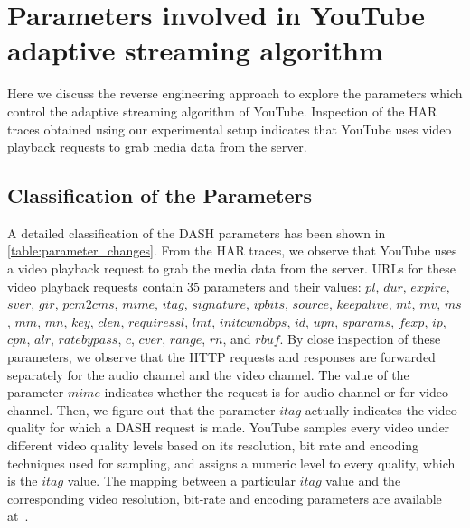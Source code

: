 \section{Parameters involved in YouTube adaptive streaming algorithm}
\label{chap03s1:sec:parameters}
Here we discuss the reverse engineering approach to explore the parameters which control the adaptive streaming algorithm of YouTube. 
Inspection of the HAR traces obtained using our experimental setup indicates that YouTube uses video playback requests to grab media data from the server.
%
\subsection{Classification of the Parameters}
A detailed classification of the DASH parameters has been shown in \tbl\ref{table:parameter_changes}. From the HAR traces, we observe that YouTube uses a video playback request to grab the media data from the server. URLs for these video playback requests contain $35$ parameters and their values: $pl$, $dur$, $expire$, $sver$, $gir$, $pcm2cms$, $mime$, $itag$, $signature$, $ipbits$, $source$, $keepalive$, $mt$, $mv$, $ms$, $mm$, $mn$, $key$, $clen$, $requiressl$, $lmt$, $initcwndbps$, $id$, $upn$, $sparams$, $fexp$, $ip$, $cpn$, $alr$, $ratebypass$, $c$, $cver$, $range$, $rn$, and $rbuf$. By close inspection of these parameters, we observe that the HTTP requests and responses are forwarded separately for the audio channel and the video channel. The value of the parameter $mime$ indicates whether the request is for audio channel or for video channel. Then, we figure out that the parameter $itag$ actually indicates the video quality for which a DASH request is made. YouTube samples every video under different video quality levels based on its resolution, bit rate and encoding techniques used for sampling, and assigns a numeric level to every quality, which is the $itag$ value. The mapping between a particular $itag$ value and the corresponding video resolution, bit-rate and encoding parameters are available at~\cite{itag}. 

